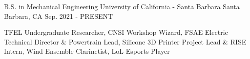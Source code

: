 


\begin{cventries}

\cventry
{B.S. in Mechanical Engineering} %
{University of California - Santa Barbara} %
{Santa Barbara, CA} %
{Sep. 2021 - PRESENT} %
{ %
\begin{cvitems}
\item {TFEL Undergraduate Researcher, CNSI Workshop Wizard, FSAE Electric Technical Director \& Powertrain Lead, Silicone 3D Printer Project Lead \& RISE Intern, Wind Ensemble Clarinetist, LoL Esports Player}
\end{cvitems}
}





\end{cventries}